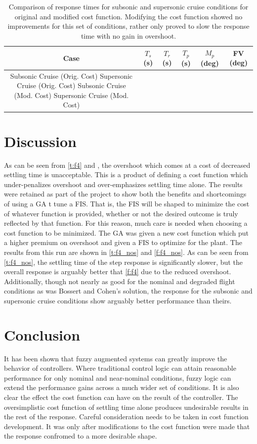 \begin{table}[ht]
    \centering
    \caption{Comparison of response times for subsonic and supersonic cruise conditions for original and
             modified cost function. Modifying the cost function showed no improvements for this set of
             conditions, rather only proved to slow the response time with no gain in overshoot.}%
             \label{t:subsup}
    \begin{tabular}{|c|c|c|c|c|c|}\hline
        Case & $T_s$ (s) & $T_r$ (s) & $T_p$ (s) &
        $M_p$ (deg) & FV (deg) \\\hline Subsonic Cruise (Orig. Cost)  Supersonic Cruise (Orig.
        Cost)  Subsonic Cruise (Mod. Cost)  Supersonic Cruise (Mod.
        Cost) 
    \end{tabular}
\end{table}

\section{Discussion} As can be seen from \cref{t:f4} and , the
overshoot which comes at a cost of decreased settling time is unacceptable. This is a product of defining a
cost function which under-penalizes overshoot and over-emphasizes settling time alone. The results were
retained as part of the project to show both the benefits and shortcomings of using a GA t tune a FIS. That
is, the FIS will be shaped to minimize the cost of whatever function is provided, whether or not the desired
outcome is truly reflected by that function. For this reason, much care is needed when choosing a cost
function to be minimized. The GA was given a new cost function which put a higher premium on overshoot and
given a FIS to optimize for the plant. The results from this run are shown in \cref{t:f4_nos} and
\cref{f:f4_nos}. As can be seen from \cref{t:f4_nos}, the settling time of the step response is significantly
slower, but the overall response is arguably better that \cref{f:f4} due to the reduced overshoot.
Additionally, though not nearly as good for the nominal and degraded flight conditions as was Bossert and
Cohen's solution, the response for the subsonic and supersonic cruise conditions show arguably better
performance than theirs.

\section{Conclusion} It has been shown that fuzzy augmented systems can greatly improve the behavior of
controllers. Where traditional control logic can attain reasonable performance for only nominal and
near-nominal conditions, fuzzy logic can extend the performance gains across a much wider set of conditions.
It is also clear the effect the cost function can have on the result of the controller. The oversimplistic
cost function of settling time alone produces undesirable results in the rest of the response. Careful
consideration needs to be taken in cost function development. It was only after modifications to the cost
function were made that the response confromed to a more desirable shape.

